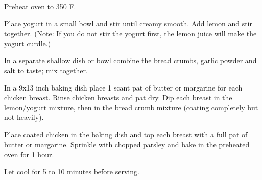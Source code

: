 
Preheat oven to 350 \degree F.

Place yogurt in a small bowl and stir until creamy smooth. 
Add lemon and stir together. (Note: If you do not stir the yogurt first, the lemon juice will make the yogurt curdle.) 

In a separate shallow dish or bowl combine the bread crumbs, garlic powder and salt to taste; mix together.

In a 9x13 inch baking dish place 1 scant pat of butter or margarine for each chicken breast. 
Rinse chicken breasts and pat dry. Dip each breast in the lemon/yogurt mixture, then in the bread crumb mixture (coating completely but not heavily).

Place coated chicken in the baking dish and top each breast with a full pat of butter or margarine. Sprinkle with chopped parsley and bake in the preheated oven for 1 hour. 

Let cool for 5 to 10 minutes before serving.